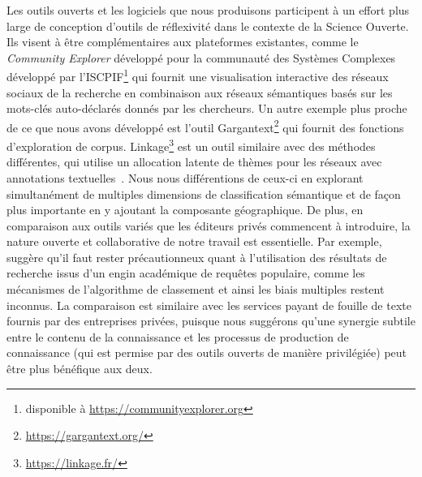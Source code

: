 {Les outils ouverts et les logiciels que nous produisons participent à un effort plus large de conception d'outils de réflexivité dans le contexte de la Science Ouverte. Ils visent à être complémentaires aux plateformes existantes, comme le \textit{Community Explorer} développé pour la communauté des Systèmes Complexes développé par l'ISCPIF\footnote{disponible à \url{https://communityexplorer.org}} qui fournit une visualisation interactive des réseaux sociaux de la recherche en combinaison aux réseaux sémantiques basés sur les mots-clés auto-déclarés donnés par les chercheurs. Un autre exemple plus proche de ce que nous avons développé est l'outil Gargantext\footnote{\url{https://gargantext.org/}} qui fournit des fonctions d'exploration de corpus. Linkage\footnote{\url{https://linkage.fr/}} est un outil similaire avec des méthodes différentes, qui utilise un allocation latente de thèmes pour les réseaux avec annotations textuelles~\citep{bouveyron2016stochastic}. Nous nous différentions de ceux-ci en explorant simultanément de multiples dimensions de classification sémantique et de façon plus importante en y ajoutant la composante géographique. De plus, en comparaison aux outils variés que les éditeurs privés commencent à introduire, la nature ouverte et collaborative de notre travail est essentielle. Par exemple, \cite{bohannon2014google} suggère qu'il faut rester précautionneux quant à l'utilisation des résultats de recherche issus d'un engin académique de requêtes populaire, comme les mécanismes de l'algorithme de classement et ainsi les biais multiples restent inconnus. La comparaison est similaire avec les services payant de fouille de texte fournis par des entreprises privées, puisque nous suggérons qu'une synergie subtile entre le contenu de la connaissance et les processus de production de connaissance (qui est permise par des outils ouverts de manière privilégiée) peut être plus bénéfique aux deux.
}









\stars





